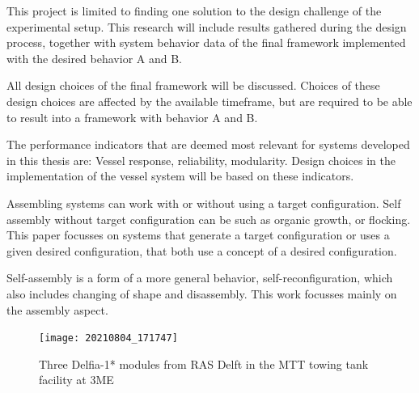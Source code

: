 This project is limited to finding one solution to the design challenge of the experimental setup. This research will include results gathered during the design process, together with system behavior data of the final framework implemented with the desired behavior A and B. 

All design choices of the final framework will be discussed. Choices of these design choices are affected by the available timeframe, but are required to be able to result into a framework with behavior A and B.

The performance indicators that are deemed most relevant for systems developed in this thesis are: Vessel response, reliability, modularity. Design choices in the implementation of the vessel system will be based on these indicators.  

Assembling systems can work with or without using a target configuration. Self assembly without target configuration can be such as organic growth, or flocking. This paper focusses on systems that generate a target configuration or uses a given desired configuration, that both use a concept of a desired configuration. 

Self-assembly is a form of a more general behavior, self-reconfiguration, which also includes changing of shape and disassembly. This work focusses mainly on the assembly aspect. 

\begin{figure}[h!]
	\centering
	\texttt{[image: 20210804\_171747]}
	\caption{Three Delfia-1* modules from RAS Delft in the MTT towing tank facility at 3ME }
	\label{fig:introDelfias}
\end{figure}

